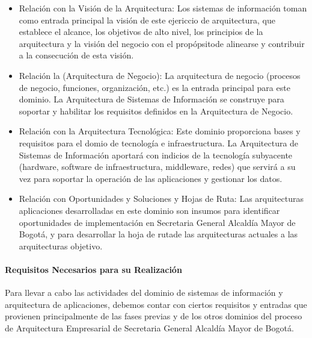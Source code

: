 \documentclass[
	a4paper, %
	12pt, %
]{include/CSSullivanBusinessReport}
\def\tightlist{}
\begin{document}
\begin{itemize}
\tightlist
\item
  Relación con la Visión de la Arquitectura: Los sistemas de información
  toman como entrada principal la visión de este ejericcio de
  arquitectura, que establece el alcance, los objetivos de alto nivel,
  los principios de la arquitectura y la visión del negocio con el
  propópsitode alinearse y contribuir a la consecución de esta visión.
\item
  Relación la (Arquitectura de Negocio): La arquitectura de negocio
  (procesos de negocio, funciones, organización, etc.) es la entrada
  principal para este dominio. La Arquitectura de Sistemas de
  Información se construye para soportar y habilitar los requisitos
  definidos en la Arquitectura de Negocio.
\item
  Relación con la Arquitectura Tecnológica: Este dominio proporciona
  bases y requisitos para el domio de tecnología e infraestructura. La
  Arquitectura de Sistemas de Información aportará con indicios de la
  tecnología subyacente (hardware, software de infraestructura,
  middleware, redes) que servirá a su vez para soportar la operación de
  las aplicaciones y gestionar los datos.
\item
  Relación con Oportunidades y Soluciones y Hojas de Ruta: Las
  arquitecturas aplicaciones desarrolladas en este dominio son insumos
  para identificar oportunidades de implementación en Secretaria General
  Alcaldía Mayor de Bogotá, y para desarrollar la hoja de rutade las
  arquitecturas actuales a las arquitecturas objetivo.
\end{itemize}

\paragraph{Requisitos Necesarios para su
Realización}\label{sec:requisitos-necesarios-para-su-realizaciuxf3n}

Para llevar a cabo las actividades del dominio de sistemas de
información y arquitectura de aplicaciones, debemos contar con ciertos
requisitos y entradas que provienen principalmente de las fases previas
y de los otros dominios del proceso de Arquitectura Empresarial de
Secretaria General Alcaldía Mayor de Bogotá.
\end{document}
